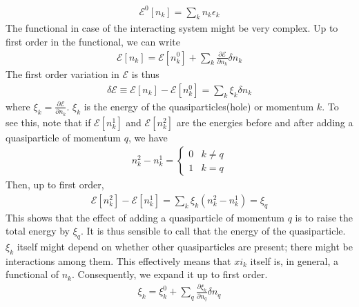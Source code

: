 \documentclass[twoside,11pt]{report}
\numberwithin{equation}{section}
\begin{document}
\begin{equation}\begin{aligned}
\mathcal{E}^0[n_k] = \sum_k n_k \epsilon_k
\end{aligned}\end{equation}
The functional in case of the interacting system might be very complex.
Up to first order in the functional, we can write
\begin{equation}\begin{aligned}
	\mathcal{E}[n_k] = \mathcal{E}[n^0_k] + \sum_k \frac{\partial{\mathcal{E}}}{\partial{n_k}}\delta n_k
\end{aligned}\end{equation}
The first order variation in \(\mathcal{E}\) is thus
\begin{equation}\begin{aligned}
	\label{tote}
\delta \mathcal{E} \equiv \mathcal{E}[n_k] -\mathcal{E}[n^0_k] = \sum_k \xi_k \delta n_k
\end{aligned}\end{equation}
where \(\xi_k = \frac{\partial{\mathcal{E}}}{\partial{n_k}}\).
\(\xi_k\) is the energy of the quasiparticles(hole) or momentum \(k\).
To see this, note that if \(\mathcal{E}[n_k^1]\) and \(\mathcal{E}[n_k^2]\) are the energies before and after adding a quasiparticle of momentum \(q\), we have
\begin{equation}\begin{aligned}
n_k^2 - n_k^1 = \begin{cases} 0 & k \neq q\\ 1 & k = q \end{cases}
\end{aligned}\end{equation}
Then, up to first order,
\begin{equation}\begin{aligned}
	\mathcal{E}[n_k^2] - \mathcal{E}[n_k^1] = \sum_k \xi_k \left(n^2_k - n^1_k\right) = \xi_q
\end{aligned}\end{equation}
This shows that the effect of adding a quasiparticle of momentum \(q\) is to raise the total energy by \(\xi_q\).
It is thus sensible to call that the energy of the quasiparticle.
\(\xi_k\) itself might depend on whether other quasiparticles are present; there might be interactions among them.
This effectively means that \(xi_k\) itself is, in general, a functional of \(n_k\).
Consequently, we expand it up to first order.
\begin{equation}\begin{aligned}
	\label{quasienergy}
	\xi_k = \xi_k^0 + \sum_q \frac{\partial{\xi_k}}{\partial{n_q}} \delta n_q
\end{aligned}\end{equation}
\end{document}
